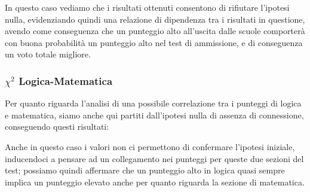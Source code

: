 In questo caso vediamo che i risultati ottenuti consentono di rifiutare l’ipotesi nulla, evidenziando quindi una relazione di dipendenza tra i risultati in questione, avendo come conseguenza che un punteggio alto all’uscita dalle scuole comporterà con buona probabilità un punteggio alto nel test di ammissione, e di conseguenza un voto totale migliore.

\subsubsection{\(\chi^2\) Logica-Matematica}

\begin{center}
\end{center}

Per quanto riguarda l’analisi di una possibile correlazione tra i punteggi di logica e matematica, siamo anche qui partiti dall’ipotesi nulla di assenza di connessione, conseguendo questi risultati:

\begin{center}
\end{center}

Anche in questo caso i valori non ci permettono di confermare l’ipotesi iniziale, inducendoci a pensare ad un collegamento nei punteggi per queste due sezioni del test; possiamo quindi affermare che un punteggio alto in logica quasi sempre implica un punteggio elevato anche per quanto riguarda la sezione di matematica.
